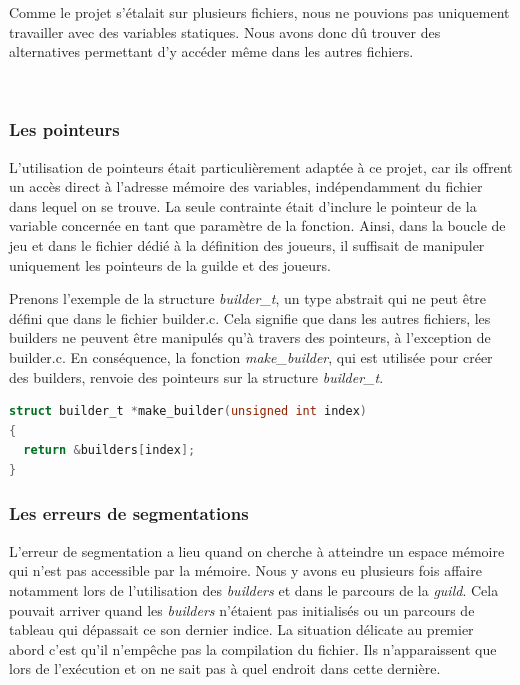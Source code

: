 \documentclass{article}
\begin{document}
\hspace{1em} Comme le projet s'étalait sur plusieurs fichiers, nous ne pouvions pas uniquement travailler avec des variables statiques. Nous avons donc dû trouver des alternatives permettant d'y accéder même dans les autres fichiers. 

\

\subsubsection{Les pointeurs}
\vspace{1em}
\hspace{1em}L'utilisation de pointeurs était particulièrement adaptée à ce projet, car ils offrent un accès direct à l'adresse mémoire des variables, indépendamment du fichier dans lequel on se trouve. La seule contrainte était d'inclure le pointeur de la variable concernée en tant que paramètre de la fonction. Ainsi, dans la boucle de jeu et dans le fichier dédié à la définition des joueurs, il suffisait de manipuler uniquement les pointeurs de la guilde et des joueurs.

Prenons l'exemple de la structure \emph{builder\_t}, un type abstrait qui ne peut être défini que dans le fichier builder.c. Cela signifie que dans les autres fichiers, les builders ne peuvent être manipulés qu'à travers des pointeurs, à l'exception de builder.c. En conséquence, la fonction \emph{make\_builder}, qui est utilisée pour créer des builders, renvoie des pointeurs sur la structure \emph{builder\_t}.

\begin{tcolorbox}[colback=gray!10,colframe=white!75!black]
\begin{lstlisting}[language=C, caption={La fonction \text{make\_builder}},label={lst:exemple0-c}]
struct builder_t *make_builder(unsigned int index)
{ 
  return &builders[index];    
}
\end{lstlisting}
\end{tcolorbox}


\subsubsection{Les erreurs de segmentations}

\hspace{1em} L'erreur de segmentation a lieu quand on cherche à atteindre un espace mémoire qui n'est pas accessible par la mémoire. Nous y avons eu plusieurs fois affaire notamment lors de l'utilisation des \emph{builders} et dans le parcours de la \emph{guild}. Cela pouvait arriver quand les \emph{builders} n'étaient pas initialisés ou un parcours de tableau qui dépassait ce son dernier indice. La situation délicate au premier abord c'est qu'il n'empêche pas la compilation du fichier. Ils n'apparaissent que lors de l'exécution et on ne sait pas à quel endroit dans cette dernière. 
\end{document}
